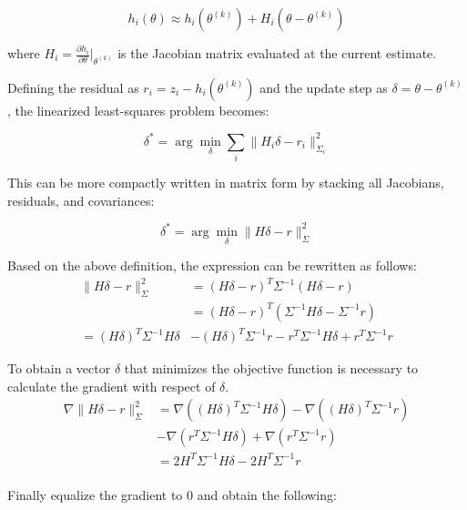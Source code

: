 \documentclass[journal]{IEEEtran}
\begin{document}
\begin{equation}
    h_i(\theta) \approx h_i(\theta^{(k)}) + H_i(\theta - \theta^{(k)})
\end{equation}

where $H_i = \frac{\partial h_i}{\partial \theta}|_{\theta^{(k)}}$ is the Jacobian matrix evaluated at the current estimate.

Defining the residual as $r_i = z_i - h_i(\theta^{(k)})$ and the update step as $\delta = \theta - \theta^{(k)}$, the linearized least-squares problem becomes:

\begin{equation}
    \delta^* = \arg\min_{\delta} \sum_i \|H_i\delta - r_i\|^2_{\Sigma_i}
\end{equation}

This can be more compactly written in matrix form by stacking all Jacobians, residuals, and covariances:

\begin{equation}
    \delta^* = \arg\min_{\delta} \|H\delta - r\|^2_\Sigma
\end{equation}

Based on the above definition, the expression can be rewritten as follows:
\[
\begin{aligned}
    \|H\delta - r\|^2_\Sigma &= \left(H \delta - r\right)^T \Sigma^{-1} \left(H \delta - r\right) \\
    &= \left(H \delta - r\right)^T \left(\Sigma^{-1} H \delta - \Sigma^{-1} r\right) \\
    = (H \delta)^T \Sigma^{-1} H \delta & - (H \delta)^T \Sigma^{-1} r - r^T \Sigma^{-1} H \delta + r^T \Sigma^{-1} r
\end{aligned}
\]

To obtain a vector $\delta$ that minimizes the objective function is necessary to calculate the gradient with respect of $\delta$.
\[
\begin{aligned}
    \nabla \|H\delta - r\|^2_\Sigma &= \nabla \left((H \delta)^T \Sigma^{-1} H \delta\right) - \nabla \left((H \delta)^T \Sigma^{-1} r\right) \\
    & - \nabla \left(r^T \Sigma^{-1} H \delta\right) + \nabla \left(r^T \Sigma^{-1} r\right) \\
    & = 2 H^T \Sigma^{-1} H \delta - 2 H^T \Sigma^{-1} r \\
\end{aligned}
\]

Finally equalize the gradient to 0 and obtain the following:
\end{document}

